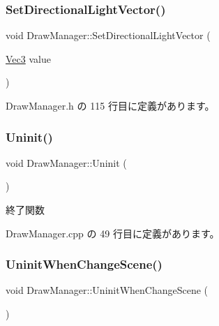 \subsubsection{\texorpdfstring{Set\+Directional\+Light\+Vector()}{SetDirectionalLightVector()}}
{\footnotesize\ttfamily void Draw\+Manager\+::\+Set\+Directional\+Light\+Vector (\begin{DoxyParamCaption}\item[{\mbox{\hyperlink{_vector3_d_8h_ab16f59e4393f29a01ec8b9bbbabbe65d}{Vec3}}}]{value }\end{DoxyParamCaption})\hspace{0.3cm}{\ttfamily [inline]}}



 Draw\+Manager.\+h の 115 行目に定義があります。

\mbox{\label{class_draw_manager_ae58095d9d734f30211011e9205aa57aa}} 
\subsubsection{\texorpdfstring{Uninit()}{Uninit()}}
{\footnotesize\ttfamily void Draw\+Manager\+::\+Uninit (\begin{DoxyParamCaption}{ }\end{DoxyParamCaption})}



終了関数 



 Draw\+Manager.\+cpp の 49 行目に定義があります。

\mbox{\label{class_draw_manager_a8b4ea38d625efbcc08d9b168cb5465f9}} 
\subsubsection{\texorpdfstring{Uninit\+When\+Change\+Scene()}{UninitWhenChangeScene()}}
{\footnotesize\ttfamily void Draw\+Manager\+::\+Uninit\+When\+Change\+Scene (\begin{DoxyParamCaption}{ }\end{DoxyParamCaption})}



